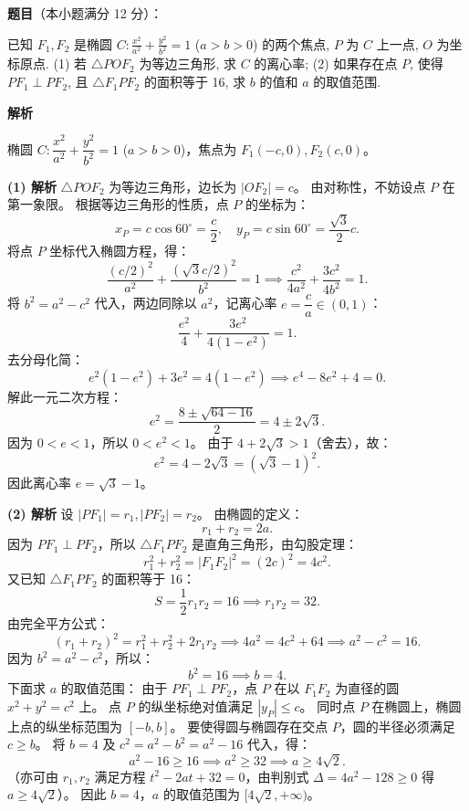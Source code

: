 \begin{answer}

\textbf{题目}（本小题满分 12 分）：

已知 $F_1, F_2$ 是椭圆 $C: \frac{x^2}{a^2} + \frac{y^2}{b^2} = 1$ ($a > b > 0$) 的两个焦点, $P$ 为 $C$ 上一点, $O$ 为坐标原点.
(1) 若 $\triangle POF_2$ 为等边三角形, 求 $C$ 的离心率;
(2) 如果存在点 $P$, 使得 $PF_1 \perp PF_2$, 且 $\triangle F_1PF_2$ 的面积等于 16, 求 $b$ 的值和 $a$ 的取值范围.

\textbf{解析}

椭圆 $C: \dfrac{x^2}{a^2} + \dfrac{y^2}{b^2} = 1$ ($a > b > 0$)，焦点为 $F_1(-c, 0), F_2(c, 0)$。

\textbf{(1) 解析}
$\triangle POF_2$ 为等边三角形，边长为 $|OF_2| = c$。
由对称性，不妨设点 $P$ 在第一象限。
根据等边三角形的性质，点 $P$ 的坐标为：
\nopagebreak[4]
\[x_P = c\cos 60^\circ = \frac{c}{2}, \quad y_P = c\sin 60^\circ = \frac{\sqrt{3}}{2}c.\]
将点 $P$ 坐标代入椭圆方程，得：
\nopagebreak[4]
\[\frac{(c/2)^2}{a^2} + \frac{(\sqrt{3}c/2)^2}{b^2} = 1 \implies \frac{c^2}{4a^2} + \frac{3c^2}{4b^2} = 1.\]
将 $b^2 = a^2 - c^2$ 代入，两边同除以 $a^2$，记离心率 $e = \dfrac{c}{a} \in (0, 1)$：
\nopagebreak[4]
\[\frac{e^2}{4} + \frac{3e^2}{4(1 - e^2)} = 1.\]
去分母化简：
\nopagebreak[4]
\[e^2(1 - e^2) + 3e^2 = 4(1 - e^2) \implies e^4 - 8e^2 + 4 = 0.\]
解此一元二次方程：
\nopagebreak[4]
\[e^2 = \frac{8 \pm \sqrt{64 - 16}}{2} = 4 \pm 2\sqrt{3}.\]
因为 $0 < e < 1$，所以 $0 < e^2 < 1$。
由于 $4 + 2\sqrt{3} > 1$（舍去），故：
\nopagebreak[4]
\[e^2 = 4 - 2\sqrt{3} = (\sqrt{3} - 1)^2.\]
因此离心率 $e = \sqrt{3} - 1$。

\textbf{(2) 解析}
设 $|PF_1| = r_1, |PF_2| = r_2$。
由椭圆的定义：
\nopagebreak[4]
\[r_1 + r_2 = 2a.\]
因为 $PF_1 \perp PF_2$，所以 $\triangle F_1PF_2$ 是直角三角形，由勾股定理：
\nopagebreak[4]
\[r_1^2 + r_2^2 = |F_1F_2|^2 = (2c)^2 = 4c^2.\]
又已知 $\triangle F_1PF_2$ 的面积等于 16：
\nopagebreak[4]
\[S = \frac{1}{2} r_1 r_2 = 16 \implies r_1 r_2 = 32.\]
由完全平方公式：
\nopagebreak[4]
\[(r_1 + r_2)^2 = r_1^2 + r_2^2 + 2r_1 r_2 \implies 4a^2 = 4c^2 + 64 \implies a^2 - c^2 = 16.\]
因为 $b^2 = a^2 - c^2$，所以：
\nopagebreak[4]
\[b^2 = 16 \implies b = 4.\]
下面求 $a$ 的取值范围：
由于 $PF_1 \perp PF_2$，点 $P$ 在以 $F_1F_2$ 为直径的圆 $x^2 + y^2 = c^2$ 上。
点 $P$ 的纵坐标绝对值满足 $|y_P| \leqslant c$。
同时点 $P$ 在椭圆上，椭圆上点的纵坐标范围为 $[-b, b]$。
要使得圆与椭圆存在交点 $P$，圆的半径必须满足 $c \geqslant b$。
将 $b = 4$ 及 $c^2 = a^2 - b^2 = a^2 - 16$ 代入，得：
\nopagebreak[4]
\[a^2 - 16 \geqslant 16 \implies a^2 \geqslant 32 \implies a \geqslant 4\sqrt{2}.\]
（亦可由 $r_1, r_2$ 满足方程 $t^2 - 2at + 32 = 0$，由判别式 $\Delta = 4a^2 - 128 \geqslant 0$ 得 $a \geqslant 4\sqrt{2}$）。
因此 $b = 4$，$a$ 的取值范围为 $[4\sqrt{2}, +\infty)$。


\end{answer}
